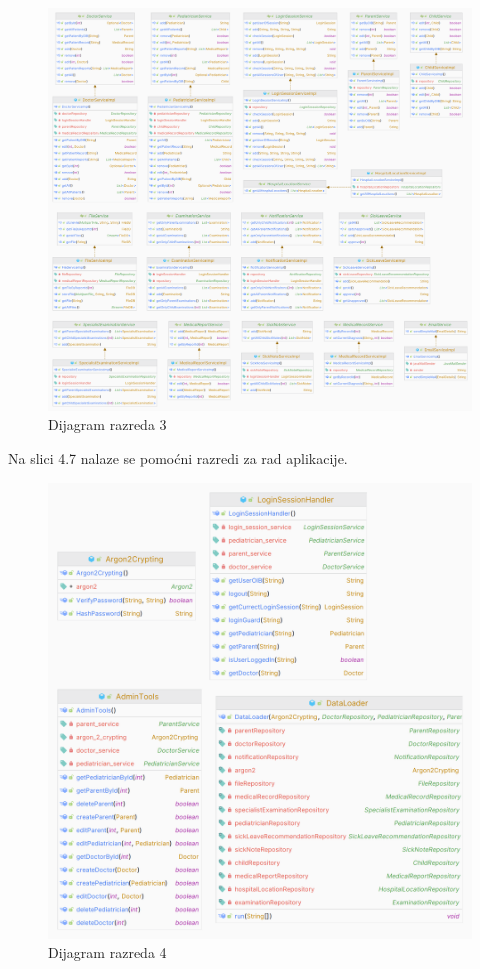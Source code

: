 			\begin{figure}[H]
				\includegraphics[scale=0.1]{dijagrami/dijraz3.PNG} %
				\centering
				\caption{Dijagram razreda 3}
				\label{fig:dijraz3}
			\end{figure}
			\clearpage
			\text Na slici 4.7 nalaze se pomoćni razredi za rad aplikacije. 
			\begin{figure}[H]
				\includegraphics[scale=0.225]{dijagrami/dijraz4.PNG} %
				\centering
				\caption{Dijagram razreda 4}
				\label{fig:dijraz4}
			\end{figure}
			
